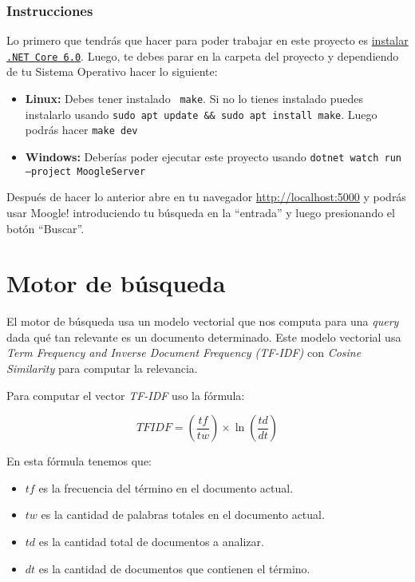 \documentclass{report}
\begin{document}
\subsubsection*{Instrucciones}

Lo primero que tendrás que hacer para poder trabajar en este proyecto es \href{https://learn.microsoft.com/es-es/dotnet/core/install/}{instalar {\tt \color{gray45}.NET Core 6.0}}.
Luego, te debes parar en la carpeta del proyecto y dependiendo de tu Sistema Operativo hacer lo siguiente:

\begin{itemize}
	\item {\bf Linux:} Debes tener instalado {\tt \color{gray45} make}. Si no lo tienes instalado
puedes instalarlo usando {\tt \color{gray45}sudo apt update \&\& sudo apt install make}. Luego podr\'as hacer {\tt \color{gray45}make dev}
	
	\item {\bf Windows:} Deberías poder ejecutar este proyecto usando {\tt \color{gray45}dotnet watch run --project MoogleServer}
\end{itemize}

Despu\'es de hacer lo anterior abre en tu navegador \href{http://localhost:5000}{http://localhost:5000} y podr\'as usar Moogle! introduciendo tu b\'usqueda en la ``entrada'' y luego presionando el bot\'on ``Buscar''.

\section*{Motor de b\'usqueda}

El motor de búsqueda usa un modelo vectorial que nos computa para una {\it query} dada 
qué tan relevante es un documento determinado. Este modelo vectorial usa  {\it Term Frequency and Inverse Document Frequency (TF-IDF)} con 
{\it Cosine Similarity} para computar la relevancia. 

Para computar el vector {\it TF-IDF} uso la fórmula:

\[ TFIDF = (\frac{tf}{tw}) \times \ln(\frac{td}{dt}) \]

En esta fórmula tenemos que:
\begin{itemize}
 \item $tf$ es la frecuencia del término en el documento actual.
 \item $tw$ es la cantidad de palabras totales en el documento actual.
 \item $td$ es la cantidad total de documentos a analizar.
 \item $dt$ es la cantidad de documentos que contienen el término.
\end{itemize}
\end{document}
